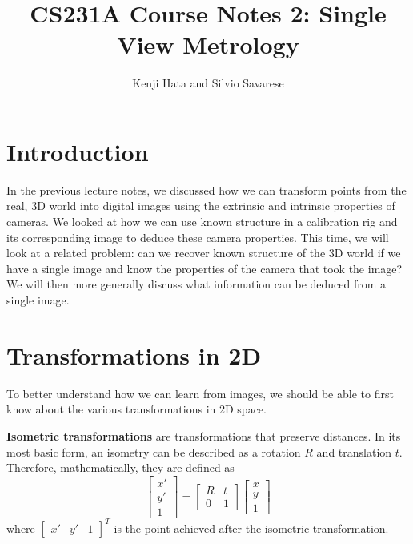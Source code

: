 \documentclass[a4paper, 12pt]{article}
\title{CS231A Course Notes 2: Single View Metrology}
\author{Kenji Hata and Silvio Savarese}
\date{}
\renewcommand\emph{\textbf}
\begin{document}
\maketitle

\section{Introduction}
In the previous lecture notes, we discussed how we can transform points from the real, 3D world into digital images using the extrinsic and intrinsic properties of cameras. We looked at how we can use known structure in a calibration rig and its corresponding image to deduce these camera properties. This time, we will look at a related problem: can we recover known structure of the 3D world if we have a single image and know the properties of the camera that took the image? We will then more generally discuss what information can be deduced from a single image.

\section{Transformations in 2D}
To better understand how we can learn from images, we should be able to first know about the various transformations in 2D space. 

\emph{Isometric transformations} are transformations that preserve distances. In its most basic form, an isometry can be described as a rotation $R$  and translation $t$. Therefore, mathematically, they are defined as
\begin{equation*}
    \begin{bmatrix}x'\\y'\\1\end{bmatrix} = \begin{bmatrix}R & t\\ 0 & 1\end{bmatrix}\begin{bmatrix}x\\y\\1\end{bmatrix}
\end{equation*}
where $\begin{bmatrix}x'&y'&1\end{bmatrix}^T$ is the point achieved after the isometric transformation. 
\end{document}
